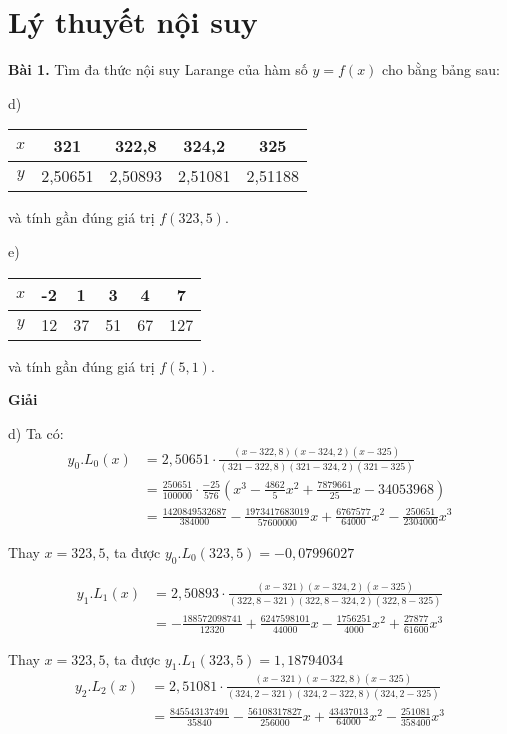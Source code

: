 \chapter{Lý thuyết nội suy}
\textbf{Bài 1.} Tìm đa thức nội suy Larange của hàm số $y=f(x)$ cho bằng bảng sau:\par
\begin{multicols}{2}
d)\begin{center}\begin{tabular}{|c|c|c|c|c|}\hline
	$x$&321&322,8&324,2&325\\ \hline
	$y$&2,50651&2,50893&2,51081&2,51188\\ \hline
\end{tabular}\end{center}
và tính gần đúng giá trị $f(323,5)$.\par
e)\begin{center}\begin{tabular}{|c|c|c|c|c|c|}
	\hline
	$x$&-2&1&3&4&7\\ \hline
	$y$&12&37&51&67&127\\ \hline
\end{tabular}\end{center}
và tính gần đúng giá trị $f(5,1)$.\par
\end{multicols}

\textbf{Giải}\par
d) Ta có:
\begin{align*}
	y_0.L_0(x)	& =2,50651\cdot\frac{(x-322,8)(x-324,2)(x-325)}{(321-322,8)(321-324,2)(321-325)}\\
				& =\frac{250651}{100000}\cdot\frac{-25}{576}\left(x^3-\frac{4862}{5}x^2+\frac{7879661}{25}x-34053968\right)\\
				& =\frac{1420849532687}{384000}-\frac{1973417683019}{57600000}x+\frac{6767577}{64000}x^2-\frac{250651}{2304000}x^3
\end{align*}

Thay $x=323,5$, ta được $y_0.L_0(323,5)=-0,07996027$\par
\begin{align*}
	y_1.L_1(x)	& =2,50893\cdot\frac{(x-321)(x-324,2)(x-325)}{(322,8-321)(322,8-324,2)(322,8-325)}\\
				& =-\frac{188572098741}{12320}+\frac{6247598101}{44000}x-\frac{1756251}{4000}x^2+\frac{27877}{61600}x^3
\end{align*}

Thay $x=323,5$, ta được $y_1.L_1(323,5)=1,18794034$
\begin{align*}
	y_2.L_2(x)	& =2,51081\cdot\frac{(x-321)(x-322,8)(x-325)}{(324,2-321)(324,2-322,8)(324,2-325)}\\
				& =\frac{845543137491}{35840}-\frac{56108317827}{256000}x+\frac{43437013}{64000}x^2-\frac{251081}{358400}x^3
\end{align*}

